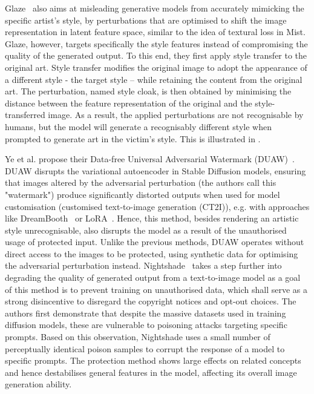 \documentclass[conference,table]{IEEEtran}
\begin{document}
Glaze~\cite{shan_glaze_2023} also aims at misleading generative models from accurately mimicking the specific artist's style, by perturbations that are optimised to shift the image representation in latent feature space, similar to the idea of textural loss in Mist.
Glaze, however, targets specifically the style features instead of compromising the quality of the generated output. 
To this end, they first apply style transfer to the original art. 
Style transfer modifies the original image to adopt the appearance of a different style - the target style -- while retaining the content from the original art. 
The perturbation, named style cloak, is then obtained by minimising the distance between the feature representation of the original and the style-transferred image.
As a result, the applied perturbations are not recognisable by humans, but the model will generate a recognisably different style when prompted to generate art in the victim's style. This is illustrated in . 

Ye et al. propose their Data-free Universal Adversarial Watermark (DUAW)~\cite{ye_duaw_2023}. 
DUAW disrupts the variational autoencoder in Stable Diffusion models, ensuring that images altered by the adversarial perturbation (the authors call this "watermark") produce significantly distorted outputs when used for model customisation (customised text-to-image generation (CT2I)), e.g. with approaches like DreamBooth~\cite{ruiz_dreambooth_2023} or LoRA~\cite{hu_lora_2021}. 
Hence, this method, besides rendering an artistic style unrecognisable, also disrupts the model as a result of the unauthorised usage of protected input. 
Unlike the previous methods, DUAW operates without direct access to the images to be protected, using synthetic data for optimising the adversarial perturbation instead. 
Nightshade~\cite{shan_prompt-specific_2023} takes a step further into degrading the quality of generated output from a text-to-image model as a goal of this method is to prevent training on unauthorised data, which shall serve as a strong disincentive to disregard the copyright notices and opt-out choices. 
The authors first demonstrate that despite the massive datasets used in training diffusion models, these are vulnerable to poisoning attacks targeting specific prompts. 
Based on this observation, Nightshade uses a small number of perceptually identical poison samples to corrupt the response of a model to specific prompts. 
The protection method shows large effects on related concepts and hence destabilises general features in the model, affecting its overall image generation ability.
\end{document}
